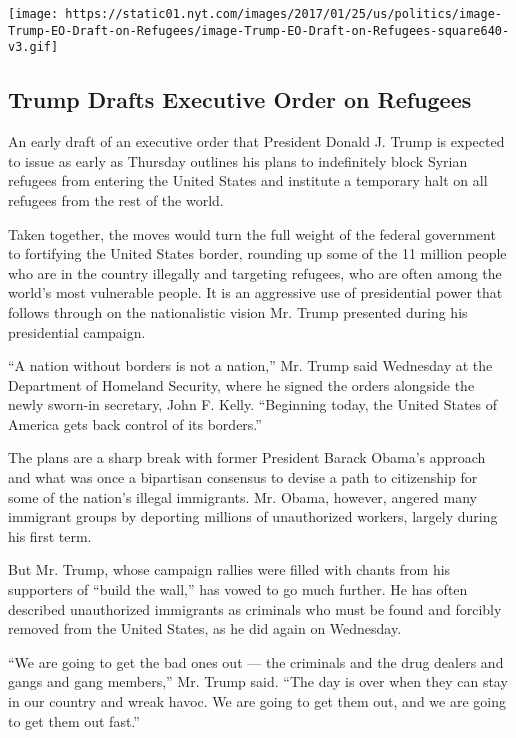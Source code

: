 \texttt{[image: https://static01.nyt.com/images/2017/01/25/us/politics/image-Trump-EO-Draft-on-Refugees/image-Trump-EO-Draft-on-Refugees-square640-v3.gif]}

\hypertarget{trump-drafts-executive-order-on-refugees}{%
\subsection{Trump Drafts Executive Order on
Refugees}\label{trump-drafts-executive-order-on-refugees}}

An early draft of an executive order that President Donald J. Trump is
expected to issue as early as Thursday outlines his plans to
indefinitely block Syrian refugees from entering the United States and
institute a temporary halt on all refugees from the rest of the world.

Taken together, the moves would turn the full weight of the federal
government to fortifying the United States border, rounding up some of
the 11 million people who are in the country illegally and targeting
refugees, who are often among the world's most vulnerable people. It is
an aggressive use of presidential power that follows through on the
nationalistic vision Mr. Trump presented during his presidential
campaign.

``A nation without borders is not a nation,'' Mr. Trump said Wednesday
at the Department of Homeland Security, where he signed the orders
alongside the newly sworn-in secretary, John F. Kelly. ``Beginning
today, the United States of America gets back control of its borders.''

The plans are a sharp break with former President Barack Obama's
approach and what was once a bipartisan consensus to devise a path to
citizenship for some of the nation's illegal immigrants. Mr. Obama,
however, angered many immigrant groups by deporting millions of
unauthorized workers, largely during his first term.

But Mr. Trump, whose campaign rallies were filled with chants from his
supporters of ``build the wall,'' has vowed to go much further. He has
often described unauthorized immigrants as criminals who must be found
and forcibly removed from the United States, as he did again on
Wednesday.

``We are going to get the bad ones out --- the criminals and the drug
dealers and gangs and gang members,'' Mr. Trump said. ``The day is over
when they can stay in our country and wreak havoc. We are going to get
them out, and we are going to get them out fast.''

